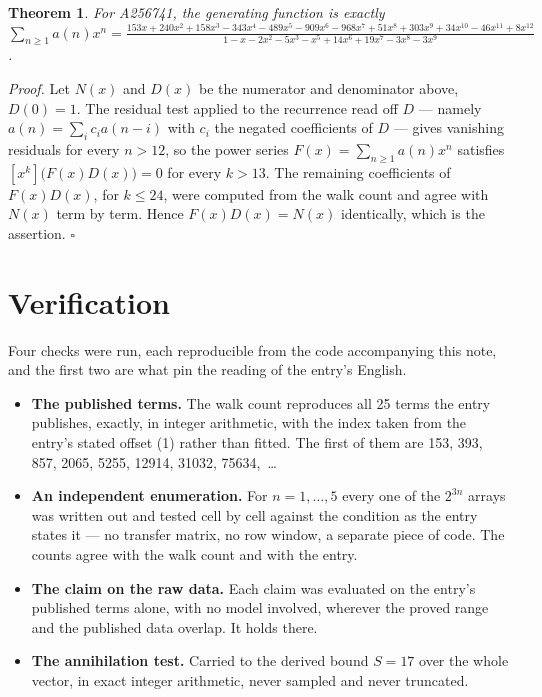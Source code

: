 \documentclass[11pt]{article}
\newtheorem{theorem}{Theorem}
\theoremstyle{definition}
\begin{document}
\begin{theorem} For A256741, the generating function is exactly $\sum_{n\ge 1} a(n)x^n = \frac{153x + 240x^{2} + 158x^{3} - 343x^{4} - 489x^{5} - 909x^{6} - 968x^{7} + 51x^{8} + 303x^{9} + 34x^{10} - 46x^{11} + 8x^{12}}{1 - x - 2x^{2} - 5x^{3} - x^{5} + 14x^{6} + 19x^{7} - 3x^{8} - 3x^{9}}$.\end{theorem}

{\itshape Proof.} Let $N(x)$ and $D(x)$ be the numerator and denominator above, $D(0)=1$. The residual test applied to the recurrence read off $D$ --- namely $a(n) = \sum_i c_i a(n-i)$ with $c_i$ the negated coefficients of $D$ --- gives vanishing residuals for every $n > 12$, so the power series $F(x)=\sum_{n\ge 1}a(n)x^n$ satisfies $[x^k]\bigl(F(x)D(x)\bigr) = 0$ for every $k > 13$. The remaining coefficients of $F(x)D(x)$, for $k \le 24$, were computed from the walk count and agree with $N(x)$ term by term. Hence $F(x)D(x) = N(x)$ identically, which is the assertion. $\square$

\section{Verification}

Four checks were run, each reproducible from the code accompanying this note, and the first two are what pin the reading of the entry's English.

\begin{itemize}

\item {\bfseries The published terms.} The walk count reproduces all 25 terms the entry publishes, exactly, in integer arithmetic, with the index taken from the entry's stated offset (1) rather than fitted. The first of them are 153, 393, 857, 2065, 5255, 12914, 31032, 75634,~\dots

\item {\bfseries An independent enumeration.} For $n = 1,\dots,5$ every one of the $2^{3n}$ arrays was written out and tested cell by cell against the condition as the entry states it --- no transfer matrix, no row window, a separate piece of code. The counts agree with the walk count and with the entry.

\item {\bfseries The claim on the raw data.} Each claim was evaluated on the entry's published terms alone, with no model involved, wherever the proved range and the published data overlap. It holds there.

\item {\bfseries The annihilation test.} Carried to the derived bound $S = 17$ over the whole vector, in exact integer arithmetic, never sampled and never truncated.

\end{itemize}
\end{document}
